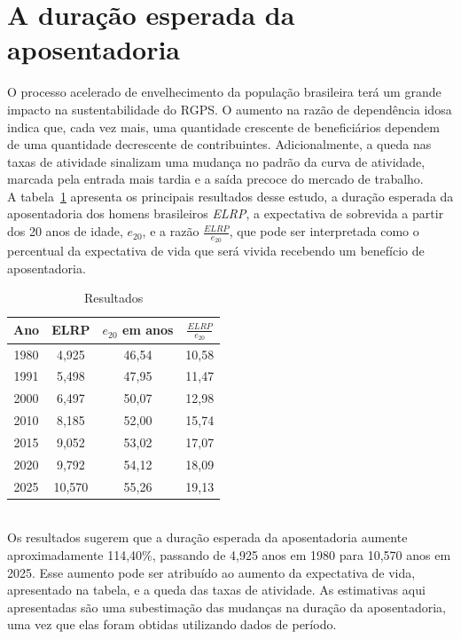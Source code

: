 \documentclass[12pt, 						%
			openright, 					%
			twoside,					%
			a4paper,x					%
			english,					%
			brazil]{abntex2}				%
\begin{document}
	\section{A duração esperada da aposentadoria \label{sec4.3}}
	O processo acelerado de envelhecimento da população brasileira terá um grande impacto na sustentabilidade do RGPS. O aumento na razão de dependência idosa indica que, cada vez mais, uma quantidade crescente de beneficiários dependem de uma quantidade decrescente de contribuintes. Adicionalmente, a queda nas taxas de atividade sinalizam uma mudança no padrão da curva de atividade, marcada pela entrada mais tardia e a saída precoce do mercado de trabalho. \\
	A tabela~\ref{tab2} apresenta os principais resultados desse estudo, a duração esperada da aposentadoria dos homens brasileiros \textit{ELRP}, a expectativa de sobrevida a partir dos 20 anos de idade, $e_{20}$, e a razão $\frac{ELRP}{e_{20}}$, que pode ser interpretada como o percentual da expectativa de vida que será vivida recebendo um benefício de aposentadoria. \\
	\begin{table}[!htb]
	\centering
		\caption{Resultados}
		\label{tab2}
		\begin{tabular}{cccc}
		\toprule
		Ano & ELRP & $e_{20}$ em anos & $\frac{ELRP}{e_{20}}$ \\
		\midrule \midrule
		1980 & 4,925 & 46,54 & 10,58                                    
		\\
		1991 & 5,498 & 47,95 & 11,47                                    
		\\
		2000 & 6,497 & 50,07 & 12,98                                   
		 \\
		2010 & 8,185 & 52,00 & 15,74                                   
		\\
		2015 & 9,052 & 53,02 & 17,07                                    
		\\
		2020 & 9,792 & 54,12 & 18,09                                    
		\\
		2025 & 10,570 & 55,26 & 19,13                                    
		\\ \bottomrule
		\end{tabular}
	\end{table} \\
	Os resultados sugerem que a duração esperada da aposentadoria aumente aproximadamente 114,40\%, passando de 4,925 anos em 1980 para 10,570 anos em 2025. Esse aumento pode ser atribuído ao aumento da expectativa de vida, apresentado na tabela, e a queda das taxas de atividade. As estimativas aqui apresentadas são uma subestimação das mudanças na duração da aposentadoria, uma vez que elas foram obtidas utilizando dados de período. \\
\end{document}
